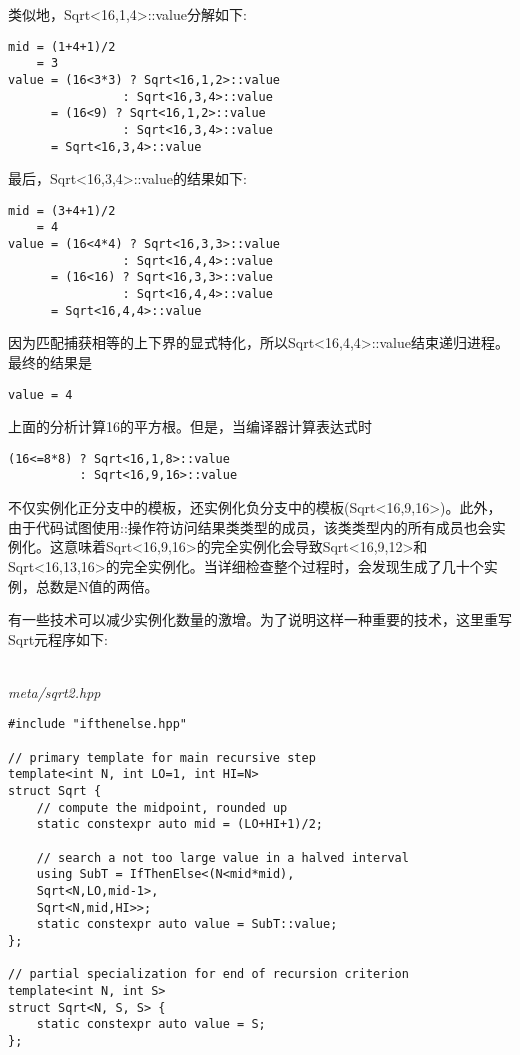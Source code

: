 类似地，Sqrt<16,1,4>::value分解如下:

\begin{lstlisting}[style=styleCXX]
mid = (1+4+1)/2
	= 3
value = (16<3*3) ? Sqrt<16,1,2>::value
				: Sqrt<16,3,4>::value
	  = (16<9) ? Sqrt<16,1,2>::value
				: Sqrt<16,3,4>::value
	  = Sqrt<16,3,4>::value
\end{lstlisting}

最后，Sqrt<16,3,4>::value的结果如下:

\begin{lstlisting}[style=styleCXX]
mid = (3+4+1)/2
	= 4
value = (16<4*4) ? Sqrt<16,3,3>::value
				: Sqrt<16,4,4>::value
	  = (16<16) ? Sqrt<16,3,3>::value
				: Sqrt<16,4,4>::value
	  = Sqrt<16,4,4>::value
\end{lstlisting}

因为匹配捕获相等的上下界的显式特化，所以Sqrt<16,4,4>::value结束递归进程。最终的结果是

\begin{lstlisting}[style=styleCXX]
value = 4
\end{lstlisting}


上面的分析计算16的平方根。但是，当编译器计算表达式时

\begin{lstlisting}[style=styleCXX]
(16<=8*8) ? Sqrt<16,1,8>::value
		  : Sqrt<16,9,16>::value
\end{lstlisting}

不仅实例化正分支中的模板，还实例化负分支中的模板(Sqrt<16,9,16>)。此外，由于代码试图使用::操作符访问结果类类型的成员，该类类型内的所有成员也会实例化。这意味着Sqrt<16,9,16>的完全实例化会导致Sqrt<16,9,12>和Sqrt<16,13,16>的完全实例化。当详细检查整个过程时，会发现生成了几十个实例，总数是N值的两倍。

有一些技术可以减少实例化数量的激增。为了说明这样一种重要的技术，这里重写Sqrt元程序如下:

\hspace*{\fill} \\ %
\noindent
\textit{meta/sqrt2.hpp}
\begin{lstlisting}[style=styleCXX]
#include "ifthenelse.hpp"

// primary template for main recursive step
template<int N, int LO=1, int HI=N>
struct Sqrt {
	// compute the midpoint, rounded up
	static constexpr auto mid = (LO+HI+1)/2;
	
	// search a not too large value in a halved interval
	using SubT = IfThenElse<(N<mid*mid),
	Sqrt<N,LO,mid-1>,
	Sqrt<N,mid,HI>>;
	static constexpr auto value = SubT::value;
};

// partial specialization for end of recursion criterion
template<int N, int S>
struct Sqrt<N, S, S> {
	static constexpr auto value = S;
};
\end{lstlisting}

